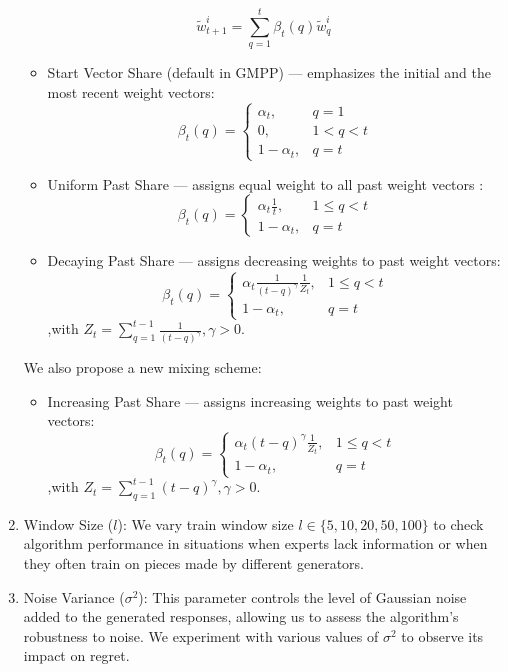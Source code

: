 \documentclass[12pt, twoside]{article}
\begin{document}
\begin{enumerate}
\[ \widetilde{w}_{t+1}^i = \sum_{q=1}^t\beta_t(q)\widetilde{w}_q^i  \]

\begin{itemize}
\item Start Vector Share (default in GMPP) --- emphasizes the initial and the most recent  weight  vectors:
    \[\beta_t(q) =
    \begin{cases}
    \alpha_t, & q = 1 \\
    0, & 1 < q < t \\
    1 - \alpha_t, & q = t 
    \end{cases}\]
    
\item Uniform Past Share ---  assigns equal weight to all past weight vectors : 
    \[\beta_t(q) =
    \begin{cases}
    \alpha_t\frac{1}{t}, & 1 \le q < t \\
    1 - \alpha_t, & q = t 
    \end{cases}\]
    
\item Decaying Past Share ---  assigns decreasing weights to past weight vectors:
    \[\beta_t(q) =
    \begin{cases}
    \alpha_t\frac{1}{(t-q)^\gamma}\frac{1}{Z_t}, & 1 \le q < t \\
    1 - \alpha_t, & q = t
    \end{cases}\]
    \hfill ,with $Z_t = \sum_{q=1}^{t-1} \frac{1}{(t-q)^\gamma}, \gamma > 0$. 
        
\end{itemize}

We also propose a new mixing scheme:
\begin{itemize}

\item Increasing Past Share --- assigns increasing weights to past weight vectors:
    \[\beta_t(q) =
    \begin{cases}
    \alpha_t(t-q)^\gamma\frac{1}{Z_t}, & 1 \le q < t \\
    1 - \alpha_t, & q = t
    \end{cases}\]
    \hfill ,with $Z_t = \sum_{q=1}^{t-1}(t-q)^\gamma, \gamma > 0$. 
        
\end{itemize}


\item Window Size ($l$): We vary train window size $l \in \{5, 10, 20, 50, 100\}$ to check algorithm performance in situations when experts lack information or when they often train on pieces made by different generators.

\item Noise Variance ($\sigma^2$): This parameter controls the level of Gaussian noise added to the generated responses, allowing us to assess the algorithm's robustness to noise. We experiment with various values of $\sigma^2$ to observe its impact on regret.
\end{enumerate}
\end{document}

